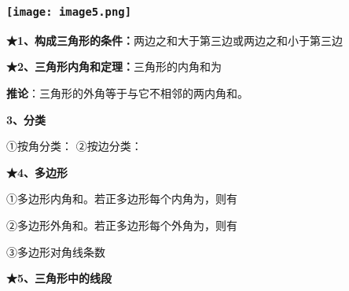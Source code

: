 \hypertarget{ux5b66ux79d1ux7f51www.zxxk.com--ux6559ux80b2ux8d44ux6e90ux95e8ux6237ux63d0ux4f9bux8bd5ux9898ux8bd5ux5377ux6559ux6848ux8bfeux4ef6ux6559ux5b66ux8bbaux6587ux7d20ux6750ux7b49ux5404ux7c7bux6559ux5b66ux8d44ux6e90ux5e93ux4e0bux8f7dux8fd8ux6709ux5927ux91cfux4e30ux5bccux7684ux6559ux5b66ux8d44ux8baf-8}{%
\subsubsection{\texorpdfstring{\protect\texttt{[image: image5.png]}}{学科网(www.zxxk.com)-\/-教育资源门户，提供试题试卷、教案、课件、教学论文、素材等各类教学资源库下载，还有大量丰富的教学资讯！}}\label{ux5b66ux79d1ux7f51www.zxxk.com--ux6559ux80b2ux8d44ux6e90ux95e8ux6237ux63d0ux4f9bux8bd5ux9898ux8bd5ux5377ux6559ux6848ux8bfeux4ef6ux6559ux5b66ux8bbaux6587ux7d20ux6750ux7b49ux5404ux7c7bux6559ux5b66ux8d44ux6e90ux5e93ux4e0bux8f7dux8fd8ux6709ux5927ux91cfux4e30ux5bccux7684ux6559ux5b66ux8d44ux8baf-8}}

\textbf{★1、构成三角形的条件：}两边之和大于第三边或两边之和小于第三边

\textbf{★2、三角形内角和定理：}三角形的内角和为

\textbf{推论}：三角形的外角等于与它不相邻的两内角和。

\textbf{3、分类}

①按角分类： ②按边分类：

\textbf{★4、多边形}

①多边形内角和。若正多边形每个内角为，则有

②多边形外角和。若正多边形每个外角为，则有

③多边形对角线条数

\textbf{★5、三角形中的线段}

